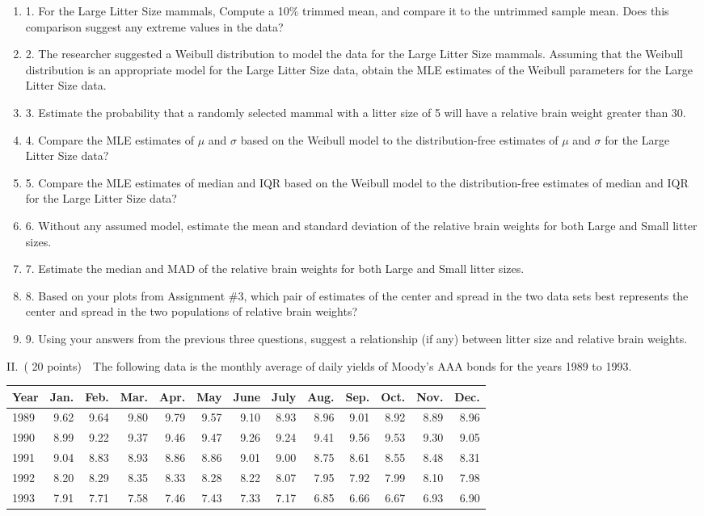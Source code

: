 \documentclass[10pt]{report}
\def\be{\begin{enumerate}}
\def\ee{\end{enumerate}}
\def\vvn{\vskip2mm\noindent}
\begin{document}
\vvn
\be
\item[1.] For the Large Litter Size mammals, Compute a 10\% trimmed mean, and compare it to the untrimmed sample mean. Does this comparison suggest any extreme values in the data?
\item[2.] The researcher suggested a Weibull distribution to model the data for the Large Litter Size mammals. Assuming that the Weibull distribution is an appropriate model for the Large Litter Size data, obtain the MLE estimates of the Weibull parameters for the Large Litter Size data.
\item[3.] Estimate the probability that a randomly selected mammal with a litter size of 5 will have a relative brain weight  greater than 30.
\item[4.] Compare the MLE estimates of $\mu$ and $\sigma$ based on the Weibull model to the distribution-free estimates of  $\mu$ and $\sigma$ for the Large Litter Size data?
\item[5.] Compare the MLE estimates of median and IQR based on the Weibull model to the distribution-free estimates of  median and IQR for the Large Litter Size data?
\item[6.] Without any assumed model, estimate the mean and standard deviation of the relative brain weights for both Large and Small litter sizes.
\item[7.] Estimate the median and MAD of the relative brain weights for both Large and Small litter sizes.
\item[8.] Based on your plots from Assignment \#3, which pair of estimates of the center and spread in the two data sets best represents the center and spread in the two populations of relative brain weights?
\item[9.] Using your answers from the previous three questions, suggest a relationship (if any) between litter size and relative brain weights.
\ee
\vvn
II.\ ( 20 points)\ \  The following data is the monthly average of daily yields of Moody's AAA bonds for the years 1989 to 1993.
\vvn\vvn
\begin{tabular}{l|rrrrrrrrrrrr}
Year&Jan.&Feb.&Mar.&Apr.&May&June&July&Aug.&Sep.&Oct.&Nov.&Dec.\\\hline
1989&9.62&9.64&9.80&9.79&9.57&9.10&8.93&8.96&9.01&8.92&8.89&8.96\\
1990&8.99&9.22&9.37&9.46&9.47&9.26&9.24&9.41&9.56&9.53&9.30&9.05\\
1991&9.04&8.83&8.93&8.86&8.86&9.01&9.00&8.75&8.61&8.55&8.48&8.31\\
1992&8.20&8.29&8.35&8.33&8.28&8.22&8.07&7.95&7.92&7.99&8.10&7.98\\
1993&7.91&7.71&7.58&7.46&7.43&7.33&7.17&6.85&6.66&6.67&6.93&6.90\\
\end{tabular}
\end{document}
